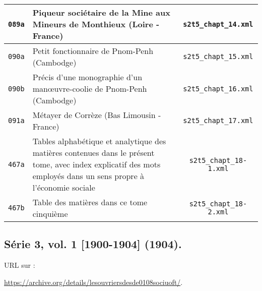 \begin{center}
\begin{longtable}{ | c | p{9.5cm} | c | }
\texttt{089a} & Piqueur sociétaire de la Mine aux Mineurs de Monthieux (Loire - France) & \texttt{s2t5\_chapt\_14.xml} \\ \hline
\texttt{090a} & Petit fonctionnaire de Pnom-Penh (Cambodge) & \texttt{s2t5\_chapt\_15.xml} \\ \hline
\texttt{090b} & Précis d'une monographie d'un manœuvre-coolie de Pnom-Penh (Cambodge) & \texttt{s2t5\_chapt\_16.xml} \\ \hline
\texttt{091a} & Métayer de Corrèze (Bas Limousin - France) & \texttt{s2t5\_chapt\_17.xml} \\ \hline
\texttt{467a} & Tables alphabétique et analytique des matières contenues dans le présent tome, avec index explicatif des mots employés dans un sens propre à l'économie sociale & \texttt{s2t5\_chapt\_18-1.xml} \\ \hline
\texttt{467b} & Table des matières dans ce tome cinquième & \texttt{s2t5\_chapt\_18-2.xml} \\ \hline
\end{longtable}
\end{center}

\subsection{Série 3, vol. 1 [1900-1904] (1904).}
\label{mappings3t1}

URL sur \ia{} : 

\url{https://archive.org/details/lesouvriersdesde0108sociuoft/}.

